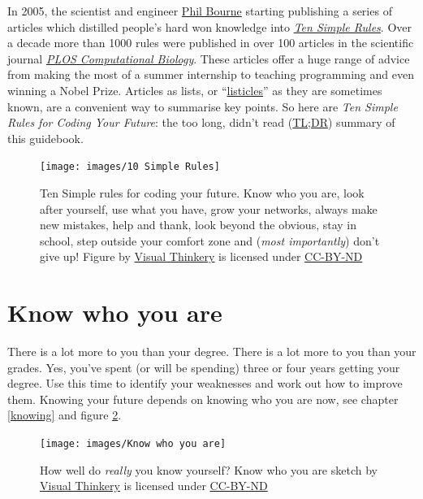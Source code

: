 \documentclass[
]{book}
\begin{document}
In 2005, the scientist and engineer \href{https://en.wikipedia.org/wiki/Philip_Bourne}{Phil Bourne} starting publishing a series of articles which distilled people's hard won knowledge into \emph{\href{https://collections.plos.org/ten-simple-rules}{Ten Simple Rules}}. \citep{Bourne2005} Over a decade more than 1000 rules were published in over 100 articles in the scientific journal \emph{\href{https://en.wikipedia.org/wiki/PLOS_Computational_Biology}{PLOS Computational Biology}}. \citep{Bourne2018} These articles offer a huge range of advice from making the most of a summer internship \citep{Aicher2017} to teaching programming \citep{tensimplebrown} and even winning a Nobel Prize. \citep{Roberts2015} Articles as lists, or ``\href{https://en.wikipedia.org/wiki/Listicle}{listicles}'' as they are sometimes known, are a convenient way to summarise key points. So here are \emph{Ten Simple Rules for Coding Your Future}: the too long, didn't read (\href{https://en.wiktionary.org/wiki/too_long;_didn\%27t_read}{TL;DR}) summary of this guidebook.

\begin{figure}

{\centering \texttt{[image: images/10 Simple Rules]} 

}

\caption{Ten Simple rules for coding your future. Know who you are, look after yourself, use what you have, grow your networks, always make new mistakes, help and thank, look beyond the obvious, stay in school, step outside your comfort zone and (\emph{most importantly}) don't give up! Figure by \href{https://visualthinkery.com/}{Visual Thinkery} is licensed under \href{https://creativecommons.org/licenses/by-nd/4.0/}{CC-BY-ND}}\label{fig:ten-simple-fig}
\end{figure}



\hypertarget{mybrand}{%
\section{Know who you are}\label{mybrand}}

There is a lot more to you than your degree. There is a lot more to you than your grades. Yes, you've spent (or will be spending) three or four years getting your degree. Use this time to identify your weaknesses and work out how to improve them. Knowing your future depends on knowing who you are now, see chapter \ref{knowing} and figure \ref{fig:knowing-fig}.

\begin{figure}

{\centering \texttt{[image: images/Know who you are]} 

}

\caption{How well do \emph{really} you know yourself? Know who you are sketch by \href{https://visualthinkery.com}{Visual Thinkery} is licensed under \href{https://creativecommons.org/licenses/by-nd/4.0/}{CC-BY-ND}}\label{fig:knowing-fig}
\end{figure}
\end{document}
